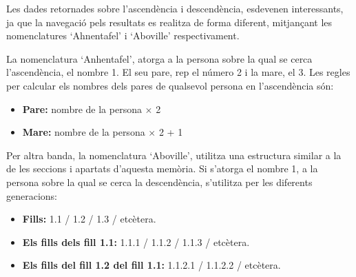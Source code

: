 Les dades retornades sobre l'ascendència i descendència, esdevenen interessants, ja que la navegació pels resultats es realitza de forma diferent, mitjançant les nomenclatures `Ahnentafel' i `Aboville' respectivament.

La nomenclatura `Anhentafel', atorga a la persona sobre la qual se cerca l'as\-cen\-dèn\-cia, el nombre 1. El seu pare, rep el número 2 i la mare, el 3. Les regles per calcular els nombres dels pares de qualsevol persona en l'ascendència són:

\begin{itemize}
    \item \textbf{Pare:} nombre de la persona $\times$ 2
    \item \textbf{Mare:} nombre de la persona $\times$ 2 + 1
\end{itemize}

Per altra banda, la nomenclatura `Aboville', utilitza una estructura similar a la de les seccions i apartats d'aquesta memòria. Si s'atorga el nombre 1, a la persona sobre la qual se cerca la descendència, s'utilitza per les diferents generacions:

\begin{itemize}
    \item \textbf{Fills:} 1.1 / 1.2 / 1.3 / etcètera.
    \item \textbf{Els fills dels fill 1.1:} 1.1.1 / 1.1.2 / 1.1.3 / etcètera.
    \item \textbf{Els fills del fill 1.2 del fill 1.1:} 1.1.2.1 / 1.1.2.2 / etcètera.
\end{itemize}
